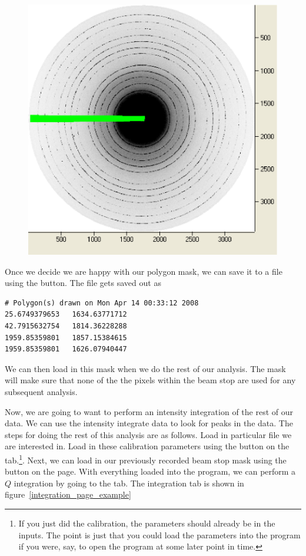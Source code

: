 \begin{figure}
    \centering
    \includegraphics[scale=.75]{figures/masked_beam_stop.eps}
    \caption{}
    \label{masked_beam_stop}
\end{figure}

Once we decide we are happy with our polygon mask, we can
save it to a file using the  button.
The file gets saved out as
\begin{lstlisting}[caption={'beam_stop_mask.dat'}]
# Polygon(s) drawn on Mon Apr 14 00:33:12 2008
25.6749379653	1634.63771712
42.7915632754	1814.36228288
1959.85359801	1857.15384615
1959.85359801	1626.07940447
\end{lstlisting}
We can then load in this mask when we do the rest of
our analysis. The mask will make sure that none of the
the pixels within the beam stop are used for any subsequent
analysis.

Now, we are going to want to perform an intensity integration 
of the rest of our data. We can use the intensity
integrate data to look for peaks in the data.
The steps for doing the rest of
this analysis are as follows. Load in particular file we
are interested in. Load in these calibration parameters
using the  button on the 
tab.\footnote{If you just did the calibration, the 
parameters should already be in the inputs. The point is
just that you could load the parameters into the program
if you were, say, to open the program at some later point
in time.}. Next, we can load in our previously recorded
beam stop mask using the  button on the
 page. With everything loaded into the program, 
we can perform a $Q$ integration by going to the 
 tab. The integration tab is shown in 
figure~\ref{integration_page_example}

